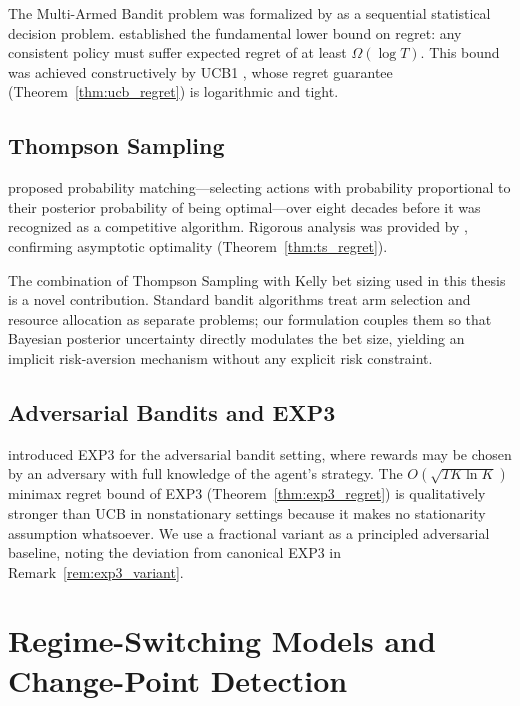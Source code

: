 The Multi-Armed Bandit problem was formalized by \citet{robbins1952} as a
sequential statistical decision problem.  \citet{lai1985asymptotically} established
the fundamental lower bound on regret: any consistent policy must suffer
expected regret of at least $\Omega(\log T)$.  This bound was achieved
constructively by UCB1 \citep{auer2002finite}, whose regret
guarantee (Theorem~\ref{thm:ucb_regret}) is logarithmic and tight.

\subsection{Thompson Sampling}

\citet{thompson1933likelihood} proposed probability matching---selecting actions with
probability proportional to their posterior probability of being optimal---over
eight decades before it was recognized as a competitive algorithm.  Rigorous
analysis was provided by \citet{agrawal2012analysis}, confirming asymptotic optimality (Theorem~\ref{thm:ts_regret}).

The combination of Thompson Sampling with Kelly bet sizing used in this thesis
is a novel contribution.  Standard bandit algorithms treat arm selection and
resource allocation as separate problems; our formulation couples them so that
Bayesian posterior uncertainty directly modulates the bet size, yielding an
implicit risk-aversion mechanism without any explicit risk constraint.

\subsection{Adversarial Bandits and EXP3}

\citet{auer2002nonstochastic} introduced EXP3 for the
adversarial bandit setting, where rewards may be chosen by an adversary with
full knowledge of the agent's strategy.  The $O(\sqrt{T K \ln K})$ minimax
regret bound of EXP3 (Theorem~\ref{thm:exp3_regret}) is qualitatively stronger
than UCB in nonstationary settings because it makes no stationarity assumption
whatsoever.  We use a fractional variant as a principled adversarial baseline,
noting the deviation from canonical EXP3 in Remark~\ref{rem:exp3_variant}.

\section{Regime-Switching Models and Change-Point Detection}

